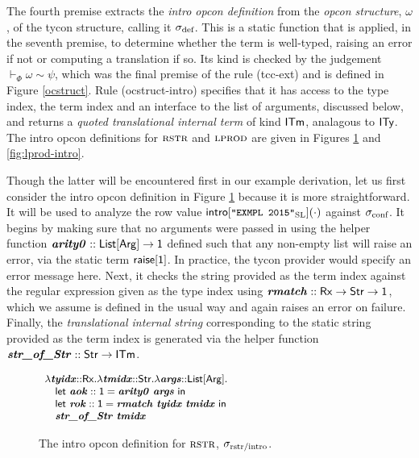 The fourth premise extracts the \emph{intro opcon definition} from the \emph{opcon structure}, $\omega$, of the tycon structure, calling it $\stx{def}$. This is a static function that is applied, in the seventh premise, to determine whether the term is well-typed, raising an error if not or computing a translation if so. Its kind is checked by the  judgement $\vdash_\Phi \omega \sim \psi$, which was the final premise of the rule (tcc-ext) and is defined in Figure \ref{ocstruct}. Rule (ocstruct-intro) specifies that it has access to the type index, the term index and an interface to the list of arguments, discussed below, and returns a \emph{quoted translational internal term} of kind $\kitm$, analagous to $\kity$. The intro opcon definitions for $\tcvar{rstr}$ and $\tcvar{lprod}$ are given in Figures \ref{fig:rstr-intro} and \ref{fig:lprod-intro}.

Though the latter will be encountered first in our example derivation, let us first consider the intro opcon definition in Figure \ref{fig:rstr-intro} because it is more  straightforward. It will be used to analyze the row value $\small\eintro{\concstr{EXMPL 2015}_\text{SL}}{\cdot}$ against $\stx{conf}$. It begins by making sure that no arguments were passed in using the helper function $\svar{arity0} :: \kargs \rightarrow \kunit$ defined such that any non-empty list will raise an error, via the static term $\sraise{\kunit}$. In practice, the tycon provider would specify an error message here. 
Next, it checks the string provided as the term index against the regular expression given as the type index using $\svar{rmatch} :: \krx \rightarrow \keyw{Str} \rightarrow \kunit$, which we assume is defined in the usual way and again raises an error on failure. Finally, the \emph{translational internal string} corresponding to the static string provided as the term index is generated via the helper function $\svar{str\_of\_Str} :: \keyw{Str} \rightarrow \kitm$.%


\begin{figure}\vspace{-5px}
$\small\begin{array}{l}
    \slam{\krx}{\svar{tyidx}}{\slam{\kstr}{\svar{tmidx}}{\slam{\kargs}{\svar{args}}{\\
\quad \keyw{let}~\svar{aok} :: \kunit = \svar{arity0}~\svar{args}~\keyw{in}~\\
\quad \keyw{let}~\svar{rok} :: \kunit = \svar{rmatch}~\svar{tyidx}~\svar{tmidx}~\keyw{in}\\
\quad \svar{str\_of\_Str}~\svar{tmidx}
}}}
\end{array}$
\caption{The intro opcon definition for $\tcvar{rstr}$,  $\stx{rstr/intro}$.}
\label{fig:rstr-intro}\vspace{-8px}
\end{figure}


